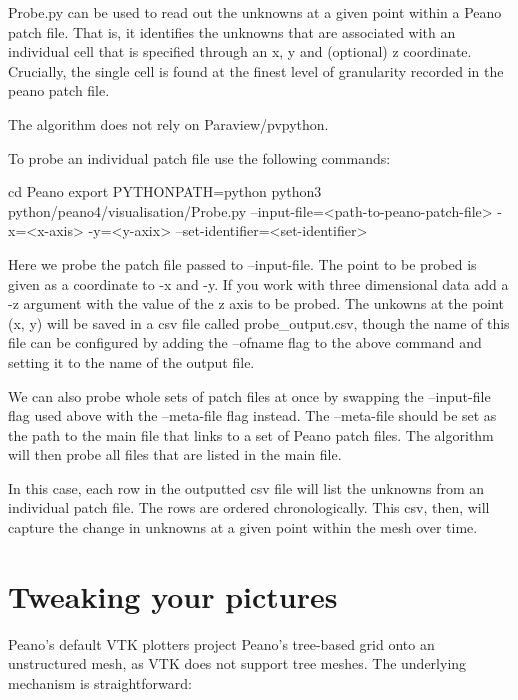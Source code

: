Probe.py can be used to read out the unknowns at a given point within a Peano patch file.
That is, it identifies the unknowns that are associated with an individual cell that is
specified through an x, y and (optional) z coordinate. Crucially, the single cell is 
found at the finest level of granularity recorded in the peano patch file.

The algorithm does not rely on Paraview/pvpython.

To probe an individual patch file use the following commands:

\begin{code}
cd Peano
export PYTHONPATH=python
python3 python/peano4/visualisation/Probe.py --input-file=<path-to-peano-patch-file> 
    -x=<x-axis> -y=<y-axix> --set-identifier=<set-identifier>
\end{code}

Here we probe the patch file passed to --input-file. The point to be probed is given
as a coordinate to -x and -y. If you work with three dimensional data add a -z argument with
the value of the z axis to be probed. The unkowns at the point (x, y) will be saved in a csv
file called probe\_output.csv, though the name of this file can be configured by adding
the --ofname flag to the above command and setting it to the name of the output file.

We can also probe whole sets of patch files at once by swapping the --input-file flag
used above with the --meta-file flag instead. The --meta-file should be set as the
path to the main file that links to a set of Peano patch files. The algorithm will
then probe all files that are listed in the main file.

In this case, each row in the outputted csv file will list the unknowns from an 
individual patch file. The rows are ordered chronologically. This csv, then, 
will capture the change in unknowns at a given point within the mesh over time.


    
\section{Tweaking your pictures}
\label{section:postprocessing:tweaking-pictures}


Peano's default VTK plotters project Peano's tree-based grid onto an
unstructured mesh, as VTK does not support tree meshes.
The underlying mechanism is straightforward:

